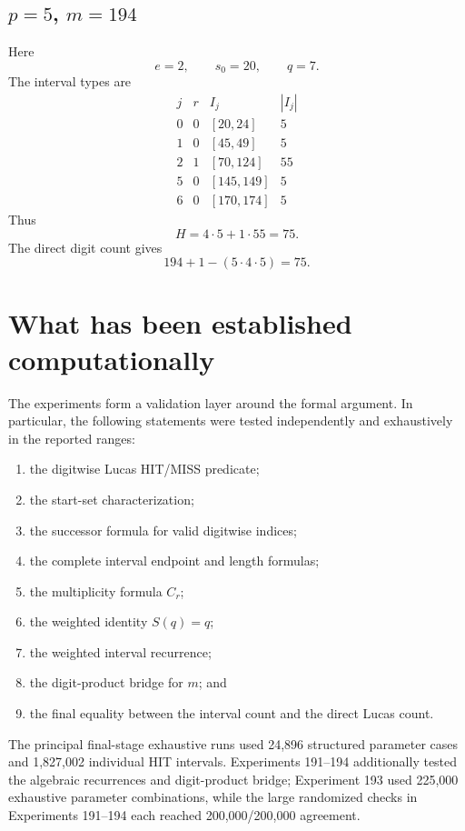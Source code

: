 \documentclass[11pt,a4paper]{article}
\theoremstyle{definition}
\theoremstyle{remark}
\begin{document}
\subsection{$p=5$, $m=194$}

Here
\[
 e=2,
 \qquad
 s_0=20,
 \qquad
 q=7.
\]
The interval types are
\[
\begin{array}{c|c|c|c}
 j&r&I_j&|I_j|\\
\hline
0&0&[20,24]&5\\
1&0&[45,49]&5\\
2&1&[70,124]&55\\
5&0&[145,149]&5\\
6&0&[170,174]&5
\end{array}
\]
Thus
\[
H=4\cdot5+1\cdot55=75.
\]
The direct digit count gives
\[
194+1-(5\cdot4\cdot5)=75.
\]

\section{What has been established computationally}

The experiments form a validation layer around the formal argument.  In particular, the following statements were tested independently and exhaustively in the reported ranges:
\begin{enumerate}[label=\arabic*.]
  \item the digitwise Lucas HIT/MISS predicate;
  \item the start-set characterization;
  \item the successor formula for valid digitwise indices;
  \item the complete interval endpoint and length formulas;
  \item the multiplicity formula $C_r$;
  \item the weighted identity $S(q)=q$;
  \item the weighted interval recurrence;
  \item the digit-product bridge for $m$; and
  \item the final equality between the interval count and the direct Lucas count.
\end{enumerate}

The principal final-stage exhaustive runs used 24,896 structured parameter cases and 1,827,002 individual HIT intervals.  Experiments 191--194 additionally tested the algebraic recurrences and digit-product bridge; Experiment 193 used 225,000 exhaustive parameter combinations, while the large randomized checks in Experiments 191--194 each reached 200,000/200,000 agreement.
\end{document}
